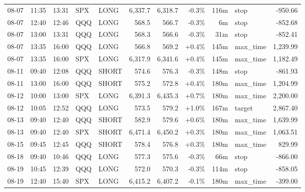 \documentclass[11pt,a4paper,twoside]{article}
\begin{document}
\begin{center}
\begin{longtable}{>{\color{txtmain}}l l l l l r r r r >{\color{txtmain}}l r}
08-07 & 11:35 & 13:31 & SPX & LONG & 6,337.7 & 6,318.7 & \textcolor{lossred}{-0.3\%} & 116m & stop & \textcolor{lossred}{-950.66} \\
08-07 & 12:40 & 12:46 & QQQ & LONG & 568.5 & 566.7 & \textcolor{lossred}{-0.3\%} & 6m & stop & \textcolor{lossred}{-852.68} \\
08-07 & 13:00 & 13:31 & QQQ & LONG & 568.3 & 566.6 & \textcolor{lossred}{-0.3\%} & 31m & stop & \textcolor{lossred}{-852.41} \\
08-07 & 13:35 & 16:00 & QQQ & LONG & 566.8 & 569.2 & \textcolor{wingreen}{+0.4\%} & 145m & max\_time & \textcolor{wingreen}{1,239.99} \\
08-07 & 13:35 & 16:00 & SPX & LONG & 6,317.9 & 6,341.6 & \textcolor{wingreen}{+0.4\%} & 145m & max\_time & \textcolor{wingreen}{1,182.49} \\
08-11 & 09:40 & 12:08 & QQQ & SHORT & 574.6 & 576.3 & \textcolor{lossred}{-0.3\%} & 148m & stop & \textcolor{lossred}{-861.93} \\
08-11 & 13:00 & 16:00 & QQQ & SHORT & 575.2 & 572.8 & \textcolor{wingreen}{+0.4\%} & 180m & max\_time & \textcolor{wingreen}{1,204.99} \\
08-12 & 10:00 & 13:00 & SPX & LONG & 6,391.3 & 6,435.3 & \textcolor{wingreen}{+0.7\%} & 180m & max\_time & \textcolor{wingreen}{2,200.00} \\
08-12 & 10:05 & 12:52 & QQQ & LONG & 573.5 & 579.2 & \textcolor{wingreen}{+1.0\%} & 167m & target & \textcolor{wingreen}{2,867.40} \\
08-13 & 09:40 & 12:40 & QQQ & SHORT & 582.9 & 579.6 & \textcolor{wingreen}{+0.6\%} & 180m & max\_time & \textcolor{wingreen}{1,639.99} \\
08-13 & 09:40 & 12:40 & SPX & SHORT & 6,471.4 & 6,450.2 & \textcolor{wingreen}{+0.3\%} & 180m & max\_time & \textcolor{wingreen}{1,063.51} \\
08-15 & 09:45 & 12:45 & QQQ & SHORT & 578.4 & 576.8 & \textcolor{wingreen}{+0.3\%} & 180m & max\_time & \textcolor{wingreen}{829.99} \\
08-18 & 09:40 & 10:46 & QQQ & LONG & 577.3 & 575.6 & \textcolor{lossred}{-0.3\%} & 66m & stop & \textcolor{lossred}{-866.00} \\
08-19 & 10:45 & 12:39 & QQQ & LONG & 572.0 & 570.3 & \textcolor{lossred}{-0.3\%} & 114m & stop & \textcolor{lossred}{-858.05} \\
08-19 & 12:40 & 15:40 & SPX & LONG & 6,415.2 & 6,407.2 & \textcolor{lossred}{-0.1\%} & 180m & max\_time & \textcolor{lossred}{-399.00} \\

\end{longtable}
\end{center}
\end{document}
